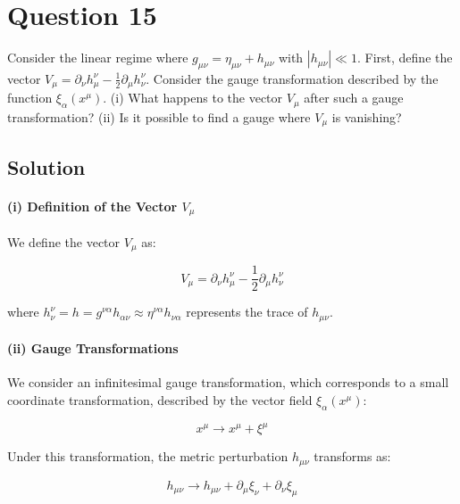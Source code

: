 \documentclass{article}
\begin{document}
\pagebreak


\section*{Question 15}

Consider the linear regime where $g_{\mu \nu}=\eta_{\mu \nu}+h_{\mu \nu}$ with $\left|h_{\mu \nu}\right| \ll 1$. First, define the vector $V_{\mu}=\partial_{\nu} h_{\mu}^{\nu}-\frac{1}{2} \partial_{\mu} h_{\nu}^{\nu}$. Consider the gauge transformation described by the function $\xi_{\alpha}\left(x^{\mu}\right)$. (i) What happens to the vector $V_{\mu}$ after such a gauge transformation? (ii) Is it possible to find a gauge where $V_{\mu}$ is vanishing?

\subsection*{Solution}

\paragraph{(i) Definition of the Vector $V_{\mu}$}

We define the vector $V_{\mu}$ as:

\begin{equation}
V_{\mu} = \partial_{\nu} h_{\mu}^{\nu} - \frac{1}{2} \partial_{\mu} h_{\nu}^{\nu}
\end{equation}

where $h_{\nu}^{\nu} = h = g^{\nu\alpha}h_{\alpha\nu} \approx \eta^{\nu \alpha}h_{\nu \alpha}$ represents the trace of $h_{\mu \nu}$.

\paragraph{(ii) Gauge Transformations}

We consider an infinitesimal gauge transformation, which corresponds to a small coordinate transformation, described by the vector field $\xi_{\alpha}(x^{\mu})$:

\begin{equation}
x^{\mu} \to x^{\mu} + \xi^{\mu}
\end{equation}

Under this transformation, the metric perturbation $h_{\mu \nu}$ transforms as:

\begin{equation}
h_{\mu \nu} \to h_{\mu \nu} + \partial_{\mu} \xi_{\nu} + \partial_{\nu} \xi_{\mu}
\end{equation}
\end{document}
